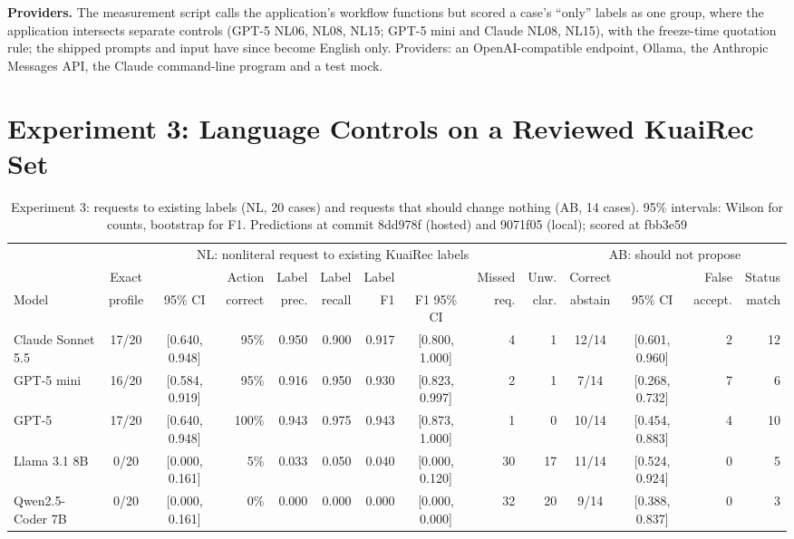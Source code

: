 \documentclass[conference]{IEEEtran}
\begin{document}
\textbf{Providers.} The measurement script calls the application's workflow functions but scored a case's ``only'' labels as one group, where the application intersects separate controls (GPT-5 NL06, NL08, NL15; GPT-5 mini and Claude NL08, NL15), with the freeze-time quotation rule; the shipped prompts and input have since become English only. Providers: an OpenAI-compatible endpoint, Ollama, the Anthropic Messages API, the Claude command-line program and a test mock.

\section{Experiment 3: Language Controls on a Reviewed KuaiRec Set}\label{sec:e3}
\begin{table}[t]\centering\footnotesize
\setlength{\tabcolsep}{3.4pt}
\caption{Experiment 3: requests to existing labels (NL, 20 cases) and requests that should change nothing (AB, 14 cases). 95\% intervals: Wilson for counts, bootstrap for F1. Predictions at commit 8dd978f (hosted) and 9071f05 (local); scored at fbb3e59}\label{tab:nlab}
\begin{tabular}{lccrrrrcrr|ccrr}\toprule
& \multicolumn{9}{c|}{NL: nonliteral request to existing KuaiRec labels} & \multicolumn{4}{c}{AB: should not propose}\\
& Exact & & Action & Label & Label & Label & & Missed & Unw. & Correct & & False & Status\\
Model & profile & 95\% CI & correct & prec. & recall & F1 & F1 95\% CI & req. & clar. & abstain & 95\% CI & accept. & match\\\midrule
Claude Sonnet 5.5 & 17/20 & [0.640, 0.948] & 95\% & 0.950 & 0.900 & 0.917 & [0.800, 1.000] & 4 & 1 & 12/14 & [0.601, 0.960] & 2 & 12\\
GPT-5 mini & 16/20 & [0.584, 0.919] & 95\% & 0.916 & 0.950 & 0.930 & [0.823, 0.997] & 2 & 1 & 7/14 & [0.268, 0.732] & 7 & 6\\
GPT-5 & 17/20 & [0.640, 0.948] & 100\% & 0.943 & 0.975 & 0.943 & [0.873, 1.000] & 1 & 0 & 10/14 & [0.454, 0.883] & 4 & 10\\
Llama 3.1 8B & 0/20 & [0.000, 0.161] & 5\% & 0.033 & 0.050 & 0.040 & [0.000, 0.120] & 30 & 17 & 11/14 & [0.524, 0.924] & 0 & 5\\
Qwen2.5-Coder 7B & 0/20 & [0.000, 0.161] & 0\% & 0.000 & 0.000 & 0.000 & [0.000, 0.000] & 32 & 20 & 9/14 & [0.388, 0.837] & 0 & 3\\
\bottomrule
\end{tabular}\end{table}
\end{document}
